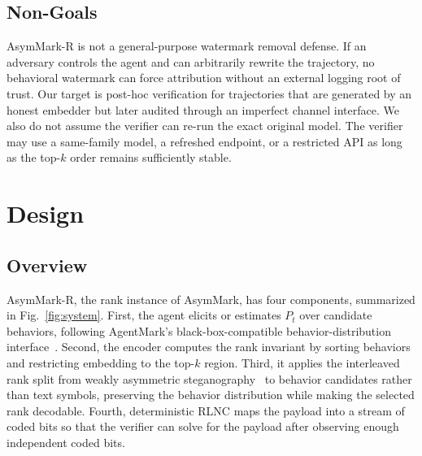 \documentclass[conference,compsoc]{IEEEtran}
\newcommand{\framework}{AsymMark}
\newcommand{\ours}{AsymMark-R}
\begin{document}
\subsection{Non-Goals}

\ours{} is not a general-purpose watermark removal defense. If an adversary controls the agent and can arbitrarily rewrite the trajectory, no behavioral watermark can force attribution without an external logging root of trust. Our target is post-hoc verification for trajectories that are generated by an honest embedder but later audited through an imperfect channel interface. We also do not assume the verifier can re-run the exact original model. The verifier may use a same-family model, a refreshed endpoint, or a restricted API as long as the top-$k$ order remains sufficiently stable.

\section{Design}
\label{sec:design}

\subsection{Overview}

\ours{}, the rank instance of \framework{}, has four components, summarized in Fig.~\ref{fig:system}. First, the agent elicits or estimates $P_t$ over candidate behaviors, following AgentMark's black-box-compatible behavior-distribution interface~\cite{agentmark2026}. Second, the encoder computes the rank invariant by sorting behaviors and restricting embedding to the top-$k$ region. Third, it applies the interleaved rank split from weakly asymmetric steganography~\cite{weakasym2026} to behavior candidates rather than text symbols, preserving the behavior distribution while making the selected rank decodable. Fourth, deterministic RLNC maps the payload into a stream of coded bits so that the verifier can solve for the payload after observing enough independent coded bits.
\end{document}
